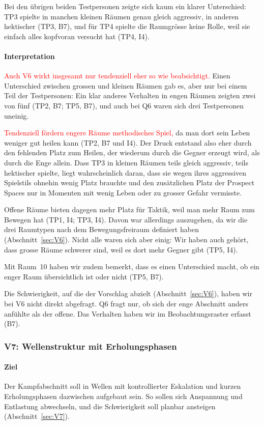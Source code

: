 \documentclass[../Main.tex]{subfiles}
\begin{document}
Bei den übrigen beiden Testpersonen zeigte sich kaum ein klarer Unterschied: TP3 spielte in manchen kleinen Räumen genau gleich aggressiv, in anderen hektischer (TP3, B7), und für TP4 spielte die Raumgrösse keine Rolle, weil sie einfach alles kopfvoran versucht hat (TP4, I4).

\paragraph{Interpretation}
\textcolor{red}{Auch V6 wirkt insgesamt nur tendenziell eher so wie beabsichtigt.} Einen Unterschied zwischen grossen und kleinen Räumen gab es, aber nur bei einem Teil der Testpersonen: Ein klar anderes Verhalten in engen Räumen zeigten zwei von fünf (TP2, B7; TP5, B7), und auch bei Q6 waren sich drei Testpersonen uneinig.

\textcolor{red}{Tendenziell fördern engere Räume methodisches Spiel,} da man dort sein Leben weniger gut heilen kann (TP2, B7 und I4). Der Druck entstand also eher durch den fehlenden Platz zum Heilen, der wiederum durch die Gegner erzeugt wird, als durch die Enge allein. Dass TP3 in kleinen Räumen teils gleich aggressiv, teils hektischer spielte, liegt wahrscheinlich daran, dass sie wegen ihres aggressiven Spielstils ohnehin wenig Platz brauchte und den zusätzlichen Platz der Prospect Spaces nur in Momenten mit wenig Leben oder zu grosser Gefahr vermisste.

Offene Räume bieten dagegen mehr Platz für Taktik, weil man mehr Raum zum Bewegen hat (TP1, I4; TP3, I4). Davon war allerdings auszugehen, da wir die drei Raumtypen nach dem Bewegungsfreiraum definiert haben (Abschnitt~\ref{sec:V6}). Nicht alle waren sich aber einig: Wir haben auch gehört, dass grosse Räume schwerer sind, weil es dort mehr Gegner gibt (TP5, I4).

Mit Raum~10 haben wir zudem bemerkt, dass es einen Unterschied macht, ob ein enger Raum übersichtlich ist oder nicht (TP5, B7).

Die Schwierigkeit, auf die der Vorschlag abzielt (Abschnitt~\ref{sec:V6}), haben wir bei V6 nicht direkt abgefragt. Q6 fragt nur, ob sich der enge Abschnitt anders anfühlte als der offene. Das Verhalten haben wir im Beobachtungsraster erfasst (B7).

\subsubsection{V7: Wellenstruktur mit Erholungsphasen}

\paragraph{Ziel}
Der Kampfabschnitt soll in Wellen mit kontrollierter Eskalation und kurzen Erholungsphasen dazwischen aufgebaut sein. So sollen sich Anspannung und Entlastung abwechseln, und die Schwierigkeit soll planbar ansteigen (Abschnitt~\ref{sec:V7}).
\end{document}
